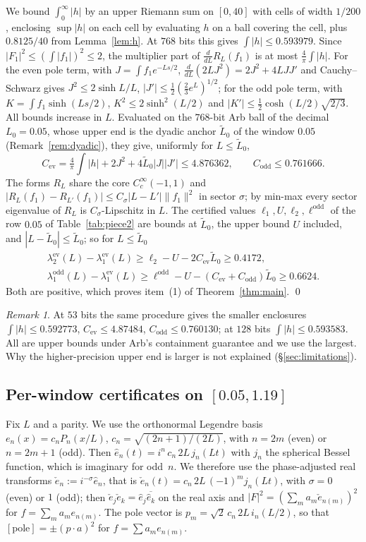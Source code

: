 \documentclass[11pt]{amsart}
\newcommand{\ev}{\mathrm{ev}}
\newcommand{\od}{\mathrm{odd}}
\newcommand{\pole}{\mathrm{pole}}
\theoremstyle{definition}
\theoremstyle{remark}
\newtheorem{remark}[theorem]{Remark}
\numberwithin{equation}{section}
\begin{document}
We bound $\int_0^\infty|h|$ by an upper Riemann sum on $[0,40]$ with cells of width $1/200$, enclosing $\sup|h|$ on each cell by evaluating $h$ on a ball covering the cell, plus $0.8125/40$ from Lemma~\ref{lem:h}. At $768$ bits this gives $\int|h|\le0.593979$. Since $|F_1|^2\le(\int|f_1|)^2\le2$, the multiplier part of $\frac{d}{dL}R_L(f_1)$ is at most $\frac4\pi\int|h|$. For the even pole term, with $J=\int f_1e^{-Ls/2}$, $\frac{d}{dL}(2LJ^2)=2J^2+4LJJ'$ and Cauchy--Schwarz gives $J^2\le2\sinh L/L$, $|J'|\le\tfrac12(\tfrac23e^L)^{1/2}$; for the odd pole term, with $K=\int f_1\sinh(Ls/2)$, $K^2\le2\sinh^2(L/2)$ and $|K'|\le\tfrac12\cosh(L/2)\sqrt{2/3}$. All bounds increase in $L$. Evaluated on the $768$-bit Arb ball of the decimal $L_0=0.05$, whose upper end is the dyadic anchor $\tilde L_0$ of the window $0.05$ (Remark~\ref{rem:dyadic}), they give, uniformly for $L\le\tilde L_0$,
\[
C_\ev=\tfrac4\pi\textstyle\int|h|+2J^2+4\tilde L_0|J||J'|\le4.876362,\qquad C_\od\le0.761666.
\]
The forms $R_L$ share the core $C_c^\infty(-1,1)$ and $|R_L(f_1)-R_{L'}(f_1)|\le C_\sigma|L-L'|\|f_1\|^2$ in sector $\sigma$; by min-max every sector eigenvalue of $R_L$ is $C_\sigma$-Lipschitz in $L$. The certified values $\ell_1,U,\ell_2,\ell^\od$ of the row $0.05$ of Table~\ref{tab:piece2} are bounds at $\tilde L_0$, the upper bound $U$ included, and $|L-\tilde L_0|\le\tilde L_0$; so for $L\le\tilde L_0$
\begin{gather*}
\lambda_2^\ev(L)-\lambda_1^\ev(L)\ge\ell_2-U-2C_\ev\tilde L_0\ge0.4172,\\
\lambda_1^\od(L)-\lambda_1^\ev(L)\ge\ell^\od-U-(C_\ev+C_\od)\tilde L_0\ge0.6624.
\end{gather*}
Both are positive, which proves item~(1) of Theorem~\ref{thm:main}. \qed

\begin{remark}
At $53$ bits the same procedure gives the smaller enclosures $\int|h|\le0.592773$, $C_\ev\le4.87484$, $C_\od\le0.760130$; at $128$ bits $\int|h|\le0.593583$. All are upper bounds under Arb's containment guarantee and we use the largest. Why the higher-precision upper end is larger is not explained (\S\ref{sec:limitations}).
\end{remark}

\subsection{Per-window certificates on $[0.05,1.19]$}\label{sec:piece2cert}
Fix $L$ and a parity. We use the orthonormal Legendre basis $e_n(x)=c_nP_n(x/L)$, $c_n=\sqrt{(2n+1)/(2L)}$, with $n=2m$ (even) or $n=2m+1$ (odd). Then $\hat e_n(t)=i^n\,c_n\,2L\,j_n(Lt)$ with $j_n$ the spherical Bessel function, which is imaginary for odd~$n$. We therefore use the phase-adjusted real transforms $\check e_n:=i^{-\sigma}\hat e_n$, that is $\check e_n(t)=c_n\,2L\,(-1)^mj_n(Lt)$, with $\sigma=0$ (even) or $1$ (odd); then $\check e_j\check e_k=\hat e_j\overline{\hat e_k}$ on the real axis and $|F|^2=(\sum_ma_m\check e_{n(m)})^2$ for $f=\sum_ma_me_{n(m)}$. The pole vector is $p_m=\sqrt2\,c_n\,2L\,i_n(L/2)$, so that $[\pole]=\pm(p\cdot a)^2$ for $f=\sum a_me_{n(m)}$.
\end{document}
